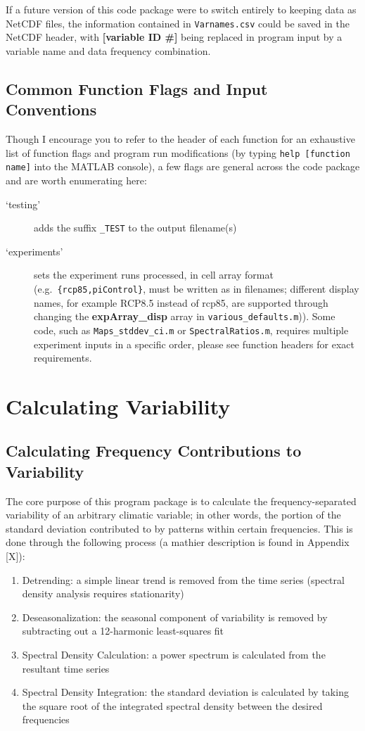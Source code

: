 \documentclass{article}
\begin{document}
If a future version of this code package were to switch entirely to keeping data as NetCDF files, the information contained in \texttt{Varnames.csv} could be saved in the NetCDF header, with \textbf{[variable ID \#]} being replaced in program input by a variable name and data frequency combination. 

\subsection{Common Function Flags and Input Conventions}
Though I encourage you to refer to the header of each function for an exhaustive list of function flags and program run modifications (by typing \texttt{help [function name]} into the MATLAB console), a few flags are general across the code package and are worth enumerating here:

\begin{description}
\item [`testing'] adds the suffix \texttt{\_TEST} to the output filename(s)
\item [`experiments'] sets the experiment runs processed, in cell array format (e.g.\ \texttt{\{rcp85,piControl\}}, must be written as in filenames; different display names, for example RCP8.5 instead of rcp85, are supported through changing the \textbf{expArray\_disp} array in \texttt{various\_defaults.m})). Some code, such as \texttt{Maps\_stddev\_ci.m} or \texttt{SpectralRatios.m}, requires multiple experiment inputs in a specific order, please see function headers for exact requirements. 
\end{description}

\section{Calculating Variability} %
\subsection{Calculating Frequency Contributions to Variability}
\label{sec:var}
The core purpose of this program package is to calculate the frequency-separated variability of an arbitrary climatic variable; in other words, the portion of the standard deviation contributed to by patterns within certain frequencies. This is done through the following process (a mathier description is found in Appendix [X]):

\begin{enumerate}
\item Detrending: a simple linear trend is removed from the time series (spectral density analysis requires stationarity)
\item Deseasonalization: the seasonal component of variability is removed by subtracting out a 12-harmonic least-squares fit
\item Spectral Density Calculation: a power spectrum is calculated from the resultant time series
\item Spectral Density Integration: the standard deviation is calculated by taking the square root of the integrated spectral density between the desired frequencies
\end{enumerate}
\end{document}
